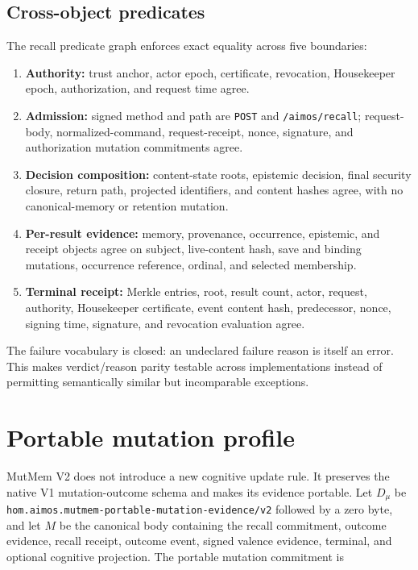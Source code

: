 \documentclass[10pt]{article}
\begin{document}
\subsection{Cross-object predicates}

The recall predicate graph enforces exact equality across five boundaries:

\begin{enumerate}
  \item \textbf{Authority:} trust anchor, actor epoch, certificate, revocation,
  Housekeeper epoch, authorization, and request time agree.
  \item \textbf{Admission:} signed method and path are \texttt{POST} and
  \texttt{/aimos/recall}; request-body, normalized-command, request-receipt,
  nonce, signature, and authorization mutation commitments agree.
  \item \textbf{Decision composition:} content-state roots, epistemic decision,
  final security closure, return path, projected identifiers, and content hashes
  agree, with no canonical-memory or retention mutation.
  \item \textbf{Per-result evidence:} memory, provenance, occurrence, epistemic,
  and receipt objects agree on subject, live-content hash, save and binding
  mutations, occurrence reference, ordinal, and selected membership.
  \item \textbf{Terminal receipt:} Merkle entries, root, result count, actor,
  request, authority, Housekeeper certificate, event content hash, predecessor,
  nonce, signing time, signature, and revocation evaluation agree.
\end{enumerate}

The failure vocabulary is closed: an undeclared failure reason is itself an
error. This makes verdict/reason parity testable across implementations instead
of permitting semantically similar but incomparable exceptions.

\section{Portable mutation profile}

MutMem V2 does not introduce a new cognitive update rule. It preserves the
native V1 mutation-outcome schema and makes its evidence portable. Let $D_\mu$
be \texttt{hom.aimos.mutmem-portable-mutation-evidence/v2} followed by a zero
byte, and let $M$ be the canonical body containing the recall commitment,
outcome evidence, recall receipt, outcome event, signed valence evidence,
terminal, and optional cognitive projection. The portable mutation commitment is
\end{document}
